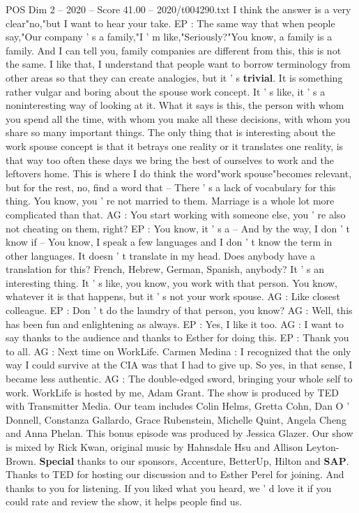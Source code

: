 \begin{textsample}{POS Dim 2 – 2020 – Score 41.00 – 2020/t004290.txt}
I think the answer is a very clear"no,"but I want to hear your take.
EP : The same way that when people say,"Our company ' s a family,"I ' m like,"Seriously?"You know, a family is a family.
And I can tell you, family companies are different from this, this is not the same.
I like that, I understand that people want to borrow terminology from other areas so that they can create analogies, but it ' s \textbf{trivial}.
It is something rather vulgar and boring about the spouse work concept.
It ' s like, it ' s a noninteresting way of looking at it.
What it says is this, the person with whom you spend all the time, with whom you make all these decisions, with whom you share so many important things.
The only thing that is interesting about the work spouse concept is that it betrays one reality or it translates one reality, is that way too often these days we bring the best of ourselves to work and the leftovers home.
This is where I do think the word"work spouse"becomes relevant, but for the rest, no, find a word that -- There ' s a lack of vocabulary for this thing.
You know, you ' re not married to them.
Marriage is a whole lot more complicated than that.
AG : You start working with someone else, you ' re also not cheating on them, right?
EP : You know, it ' s a -- And by the way, I don ' t know if -- You know, I speak a few languages and I don ' t know the term in other languages.
It doesn ' t translate in my head.
Does anybody have a translation for this?
French, Hebrew, German, Spanish, anybody?
It ' s an interesting thing.
It ' s like, you know, you work with that person.
You know, whatever it is that happens, but it ' s not your work spouse.
AG : Like closest colleague.
EP : Don ' t do the laundry of that person, you know?
AG : Well, this has been fun and enlightening as always.
EP : Yes, I like it too.
AG : I want to say thanks to the audience and thanks to Esther for doing this.
EP : Thank you to all.
AG : Next time on WorkLife.
Carmen Medina : I recognized that the only way I could survive at the CIA was that I had to give up.
So yes, in that sense, I became less authentic.
AG : The double-edged sword, bringing your whole self to work.
WorkLife is hosted by me, Adam Grant.
The show is produced by TED with Transmitter Media.
Our team includes Colin Helms, Gretta Cohn, Dan O ' Donnell, Constanza Gallardo, Grace Rubenstein, Michelle Quint, Angela Cheng and Anna Phelan.
This bonus episode was produced by Jessica Glazer.
Our show is mixed by Rick Kwan, original music by Hahnsdale Hsu and Allison Leyton-Brown. \textbf{Special} thanks to our sponsors, Accenture, BetterUp, Hilton and \textbf{SAP}.
Thanks to TED for hosting our discussion and to Esther Perel for joining.
And thanks to you for listening.
If you liked what you heard, we ' d love it if you could rate and review the show, it helps people find us.

\end{textsample}
